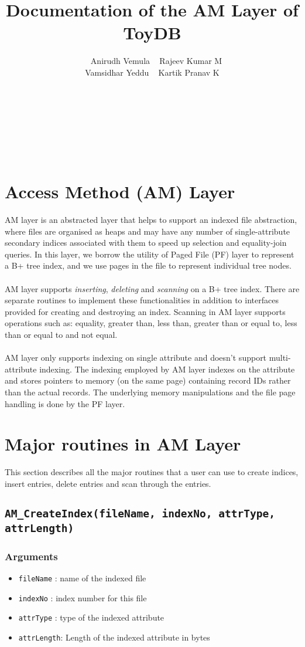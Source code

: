 \documentclass[a4paper, 12pt]{article}
\title{\textbf{Documentation of the AM Layer of ToyDB}}
\author{~~Anirudh Vemula ~ Rajeev Kumar M \\ Vamsidhar Yeddu ~ Kartik Pranav K \\ \\ \\ \\ \\ \\ \\}
\begin{document}
\maketitle
\newpage
{}
\section*{Access Method (AM) Layer}
AM layer is an abstracted layer that helps to support an indexed file abstraction, where files are organised as heaps and may have any number of single-attribute secondary indices associated with them to speed up selection and equality-join queries. In this layer, we borrow the utility of Paged File (PF) layer to represent a B+ tree index, and we use pages in the file to represent individual tree nodes. \\ \\
AM layer supports \emph{inserting}, \emph{deleting} and \emph{scanning} on a B+ tree index. There are separate routines to implement these functionalities in addition to interfaces provided for creating and destroying an index. Scanning in AM layer supports operations such as: equality, greater than, less than, greater than or equal to, less than or equal to and not  equal. \\ \\
AM layer only supports indexing on single attribute and doesn't support multi-attribute indexing. The indexing employed by AM layer indexes on the attribute and stores pointers to memory (on the same page) containing record IDs rather than the actual records. The underlying memory manipulations and the file page handling is done by the PF layer.

\section{Major routines in AM Layer}
This section describes all the major routines that a user can use to create indices, insert entries, delete entries and scan through the entries.
\subsection{\texttt{AM\_CreateIndex(fileName, indexNo, attrType, attrLength)}}
\subsubsection{Arguments}
\begin{itemize}
	\item{\texttt{fileName} : name of the indexed file}
	\item{\texttt{indexNo} : index number for this file}
	\item{\texttt{attrType} : type of the indexed attribute}
	\item{\texttt{attrLength}: Length of the indexed attribute in bytes}
\end{itemize}
\end{document}
